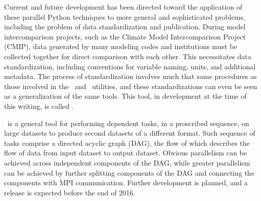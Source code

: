 Current and future development has been directed toward the application of these parallel Python techniques to more general and sophisticated problems, including the problem of data standardization and publication.  During model intercomparison projects, such as the Climate Model Intercomparison Project (CMIP), data generated by many modeling codes and institutions must be collected together for direct comparison with each other.  This necessitates data standardization, including conventions for variable naming, units, and additional metadata.  The process of standardization involves much that same procedures as those involved in the \pyreshaper\ and \pyaverager\ utilities, and these standardizations can even be seen as a generalization of the same tools.  This tool, in development at the time of this writing, is called \pyconform.

\pyconform\ is a general tool for performing dependent tasks, in a proscribed sequence, on large datasets to produce second datasets of a different format.  Such sequence of tasks comprise a directed acyclic graph (DAG), the flow of which describes the flow of data from input dataset to output dataset.  Obvious parallelism can be achieved across independent components of the DAG, while greater parallelism can be achieved by further splitting components of the DAG and connecting the components with MPI communication.  Further development is planned, and a release is expected before the end of 2016.

